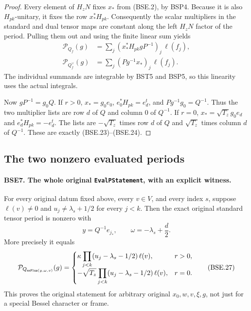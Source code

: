 \documentclass[11pt,a4paper]{article}
\numberwithin{equation}{section}
\theoremstyle{remark}\newtheorem{remark}[theorem]{Remark}
\begin{document}
\begin{proof}
Every element of $H_zN$ fixes $x_*$ from (BSE.2), by BSP4.
Because it is also $H_{pk}$-unitary, it fixes the row $x_*^*H_{pk}$.
Consequently the scalar multipliers in the standard and dual
tensor maps are constant along the left $H_zN$ factor of the
period.  Pulling them out and using the finite linear sum yields
\[
 \begin{split}
 \mathcal P_{Q_f}(g)
     &=\sum_j(x_*^*H_{pk}gP^{-1})_j\,\ell(f_j),\\
 \mathcal P_{Q_f^\vee}(g)
     &=\sum_j(Pg^{-1}x_*)_j\,\ell(f_j).
 \end{split}
 \tag{BSE.25}
\]
The individual summands are integrable by BST5 and BSP5, so this
linearity uses the actual integrals.

Now $gP^{-1}=g_0Q$.
If $r>0$, $x_*=g_0e_0$,
$e_0^*H_{pk}=e_d^t$, and $Pg^{-1}g_0=Q^{-1}$.
Thus the two multiplier lists are row $d$ of $Q$ and column
$0$ of $Q^{-1}$.
If $r=0$, $x_*=\sqrt{T_z}g_0e_d$ and
$e_d^*H_{pk}=-e_d^t$.  The lists are
$-\sqrt{T_z}$ times row $d$ of $Q$ and
$\sqrt{T_z}$ times column $d$ of $Q^{-1}$.
These are exactly (BSE.23)--(BSE.24).
\end{proof}

\subsection{The two nonzero evaluated periods}

\paragraph{BSE7. The whole original \texttt{Eval\allowbreak PStatement}, with an explicit witness.}
\label{claim:BSE7}
For every original datum fixed above, every $v\in V$, and every
index $s$, suppose $\ell(v)\ne0$ and
$u_j\ne\lambda_s+1/2$ for every $j<k$.
Then the exact original standard tensor period is nonzero with
\[
       y=Q^{-1}e_{j_*},\qquad
       \omega=-\lambda_s+\frac d2 .
 \tag{BSE.26}
\]
More precisely it equals
\[
 \mathcal P_{Q_{\texttt{nn\allowbreak Plus}(y,\omega,v)}}(g)
   =
 \begin{cases}
 \displaystyle \kappa\prod_{j<k}(u_j-\lambda_s-1/2)\,\ell(v),
                                                   &r>0,\\[2mm]
 \displaystyle -\sqrt{T_z}\prod_{j<k}(u_j-\lambda_s-1/2)\,\ell(v),
                                                   &r=0 .
 \end{cases}
 \tag{BSE.27}
\]
This proves the original statement for arbitrary original
$x_0,w,v,\xi,g$, not just for a special Bessel character or frame.
\end{document}
